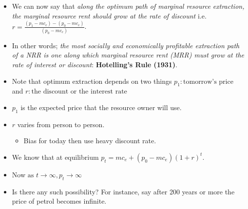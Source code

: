 \documentclass[
  ignorenonframetext,
]{beamer}
\providecommand{\tightlist}{%
  \setlength{\itemsep}{0pt}\setlength{\parskip}{0pt}}\usepackage{longtable,booktabs,array}
\begin{document}
\begin{frame}
\begin{itemize}
\tightlist
\item
  We can now say that \emph{along the optimum path of marginal resource
  extraction, the marginal resource rent should grow at the rate of
  discount} i.e.~\(r = \frac{(p_1 - mc_e)-(p_0 - mc_e)}{(p_0 - mc_e)}\).
\item
  In other words; \emph{the most socially and economically profitable
  extraction path of a NRR is one along which marginal resource rent
  (MRR) must grow at the rate of interest or discount}:
  \textbf{Hotelling's Rule (1931)}.
\end{itemize}
\end{frame}

\begin{frame}
\begin{itemize}
\tightlist
\item
  Note that optimum extraction depends on two things
  \(p_1: \text{tomorrow's price }\) and
  \(r: \text{the discount or the interest rate}\)
\item
  \(p_1\) is the expected price that the resource owner will use.
\item
  \(r\) varies from person to person.

  \begin{itemize}
  \tightlist
  \item
    Bias for today then use heavy discount rate.
  \end{itemize}
\end{itemize}
\end{frame}

\begin{frame}
\begin{itemize}
\tightlist
\item
  We know that at equilibrium \(p_t = mc_e + (p_0 - mc_e)(1 + r)^t\).
\item
  Now \(\text{as }t \rightarrow \infty, p_t \rightarrow \infty\)
\item
  Is there any such possibility? For instance, say after 200 years or
  more the price of petrol becomes infinite.
\end{itemize}
\end{frame}
\end{document}
